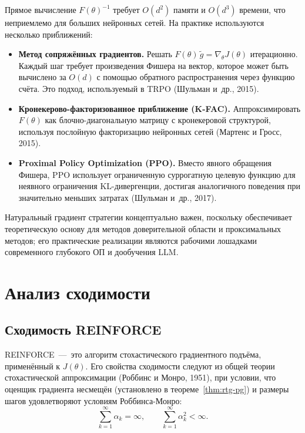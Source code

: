 Прямое вычисление $F(\theta)^{-1}$ требует $O(d^2)$ памяти и $O(d^3)$ времени, что неприемлемо для больших нейронных сетей. На практике используются несколько приближений:
\begin{itemize}[leftmargin=*]
\item \textbf{Метод сопряжённых градиентов.}  Решать $F(\theta)\, \tilde g = \nabla_\theta J(\theta)$ итерационно. Каждый шаг требует произведения Фишера на вектор, которое может быть вычислено за $O(d)$ с помощью обратного распространения через функцию счёта. Это подход, используемый в TRPO (Шульман и~др., 2015).

\item \textbf{Кронекерово-факторизованное приближение (K-FAC).}  Аппроксимировать $F(\theta)$ как блочно-диагональную матрицу с кронекеровой структурой, используя послойную факторизацию нейронных сетей (Мартенс и Гросс, 2015).

\item \textbf{Proximal Policy Optimization (PPO).}  Вместо явного обращения Фишера, PPO использует ограниченную суррогатную целевую функцию для неявного ограничения KL-дивергенции, достигая аналогичного поведения при значительно меньших затратах (Шульман и~др., 2017).
\end{itemize}
Натуральный градиент стратегии концептуально важен, поскольку обеспечивает теоретическую основу для методов доверительной области и проксимальных методов; его практические реализации являются рабочими лошадками современного глубокого ОП и дообучения LLM.

\section{Анализ сходимости}
\label{sec:pg-convergence}


\subsection{Сходимость REINFORCE}

REINFORCE \,---\, это алгоритм стохастического градиентного подъёма, применённый к $J(\theta)$. Его свойства сходимости следуют из общей теории стохастической аппроксимации (Роббинс и Монро, 1951), при условии, что оценщик градиента несмещён (установлено в теореме~\ref{thm:rtg-pg}) и размеры шагов удовлетворяют условиям Роббинса-Монро:
\begin{equation}
\label{eq:rm-conditions-ch8}
\sum_{k=1}^\infty \alpha_k = \infty, \qquad \sum_{k=1}^\infty \alpha_k^2 < \infty.
\end{equation}

